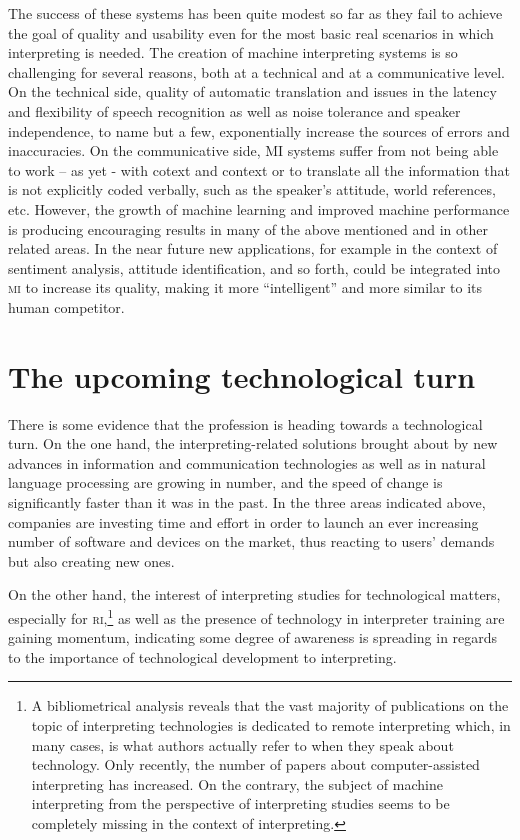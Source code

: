\documentclass[output=paper]{langsci/langscibook}
\begin{document}
The success of these systems has been quite modest so far as they fail to achieve the goal of quality and usability even for the most basic real scenarios in which interpreting is needed. The creation of machine interpreting systems is so challenging for several reasons, both at a technical and at a communicative level. On the technical side, quality of automatic translation and issues in the latency and flexibility of speech recognition as well as noise tolerance and speaker independence, to name but a few, exponentially increase the sources of errors and inaccuracies. On the communicative side, \textsc{MI} systems suffer from not being able to work – as yet - with cotext and context or to translate all the information that is not explicitly coded verbally, such as the speaker's attitude, world references, etc. However, the growth of machine learning and improved machine performance is producing encouraging results in many of the above mentioned and in other related areas. In the near future new applications, for example in the context of sentiment analysis, attitude identification, and so forth, could be integrated into \textsc{mi} to increase its quality, making it more ``intelligent'' and more similar to its human competitor. 
 
\section{The upcoming technological turn} 
There is some evidence that the profession is heading towards a technological turn. On the one hand, the interpreting-related solutions brought about by new advances in information and communication technologies as well as in natural language processing are growing in number, and the speed of change is significantly faster than it was in the past. In the three areas indicated above, companies are investing time and effort in order to launch an ever increasing number of software and devices on the market, thus reacting to users’ demands but also creating new ones.  
 
   
On the other hand, the interest of interpreting studies for technological matters, especially for \textsc{ri},\footnote{A bibliometrical analysis reveals that the vast majority of publications on the topic of interpreting technologies is dedicated to remote interpreting which, in many cases, is what authors actually refer to when they speak about technology. Only recently, the number of papers about computer-assisted interpreting has increased. On the contrary, the subject of machine interpreting from the perspective of interpreting studies seems to be completely missing in the context of interpreting.} as well as the presence of technology in interpreter training are gaining momentum, indicating some degree of awareness is spreading in regards to the importance of technological development to interpreting. 
 
\end{document}
